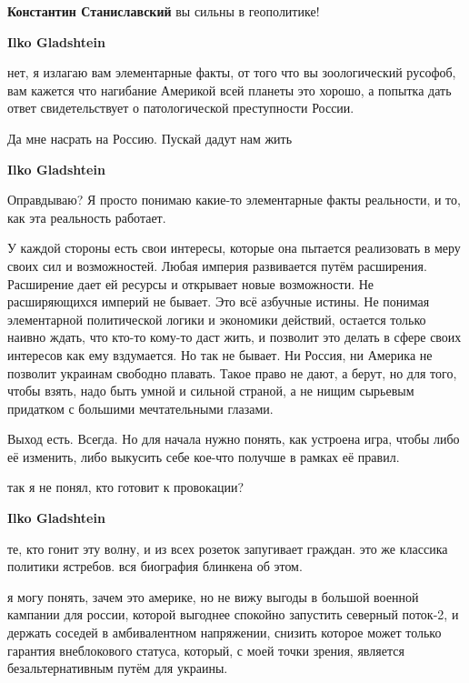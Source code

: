 \begin{itemize}
\begin{itemize}
\textbf{Константин Станиславский} вы сильны в геополитике!

\textbf{Ilko Gladshtein} 

нет, я излагаю вам элементарные факты, от того что вы зоологический русофоб,
вам кажется что нагибание Америкой всей планеты это хорошо, а попытка дать
ответ свидетельствует о патологической преступности России.



Да мне насрать на Россию. Пускай дадут нам жить

\textbf{Ilko Gladshtein} 

Оправдываю? Я просто понимаю какие-то элементарные факты реальности, и то, как
эта реальность работает.

У каждой стороны есть свои интересы, которые она пытается реализовать в меру
своих сил и возможностей. Любая империя развивается путём расширения.
Расширение дает ей ресурсы и открывает новые возможности. Не расширяющихся
империй не бывает. Это всё азбучные истины. Не понимая элементарной
политической логики и экономики действий, остается только наивно ждать, что
кто-то кому-то даст жить, и позволит это делать в сфере своих интересов как ему
вздумается. Но так не бывает. Ни Россия, ни Америка не позволит украинам
свободно плавать. Такое право не дают, а берут, но для того, чтобы взять, надо
быть умной и сильной страной, а не нищим сырьевым придатком с большими
мечтательными глазами.

Выход есть. Всегда. Но для начала нужно понять, как устроена игра, чтобы либо
её изменить, либо выкусить себе кое-что получше в рамках её правил.

\end{itemize} %


так я не понял, кто готовит к провокации?

\begin{itemize} %
\textbf{Ilko Gladshtein} 

те, кто гонит эту волну, и из всех розеток запугивает граждан. это же классика
политики ястребов. вся биография блинкена об этом.

я могу понять, зачем это америке, но не вижу выгоды в большой военной кампании
для россии, которой выгоднее спокойно запустить северный поток-2, и держать
соседей в амбивалентном напряжении, снизить которое может только гарантия
внеблокового статуса, который, с моей точки зрения, является безальтернативным
путём для украины.


\end{itemize}
\end{itemize}

